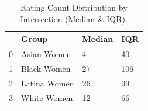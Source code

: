 \begin{table}[htbp]
\centering
\caption{Rating Count Distribution by Intersection (Median & IQR).}
\label{tab:eda_rating_count_by_group}
\begin{tabular}{llll}
\toprule
 & Group & Median & IQR \\
\midrule
0 & Asian Women & 4 & 40 \\
1 & Black Women & 27 & 106 \\
2 & Latina Women & 26 & 99 \\
3 & White Women & 12 & 66 \\
\bottomrule
\end{tabular}

\end{table}